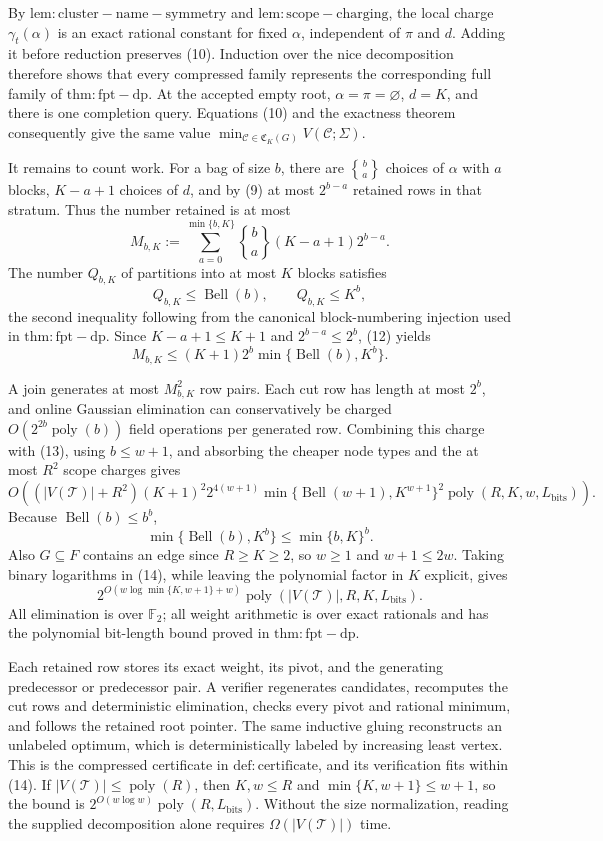 By \(\mathrm{lem:cluster-name-symmetry}\) and \(\mathrm{lem:scope-charging}\), the local charge \(\gamma_t(\alpha)\) is an exact rational constant for fixed \(\alpha\), independent of \(\pi\) and \(d\).  Adding it before reduction preserves (10).  Induction over the nice decomposition therefore shows that every compressed family represents the corresponding full family of \(\mathrm{thm:fpt-dp}\).  At the accepted empty root, \(\alpha=\pi=\varnothing\), \(d=K\), and there is one completion query.  Equations (10) and the exactness theorem consequently give the same value \(\min_{\mathcal C\in\mathfrak C_K(G)}V(\mathcal C;\Sigma)\).

It remains to count work.  For a bag of size \(b\), there are \(\genfrac{\{} {\}}{0pt}{}{b}{a}\) choices of \(\alpha\) with \(a\) blocks, \(K-a+1\) choices of \(d\), and by (9) at most \(2^{b-a}\) retained rows in that stratum.  Thus the number retained is at most
\[
 M_{b,K}:=
 \sum_{a=0}^{\min\{b,K\}}
 \genfrac{\{} {\}}{0pt}{}{b}{a}(K-a+1)2^{b-a}.
\tag{12}
\]
The number \(Q_{b,K}\) of partitions into at most \(K\) blocks satisfies
\[
 Q_{b,K}\le\operatorname{Bell}(b),\qquad Q_{b,K}\le K^b,
\]
the second inequality following from the canonical block-numbering injection used in \(\mathrm{thm:fpt-dp}\).  Since \(K-a+1\le K+1\) and \(2^{b-a}\le2^b\), (12) yields
\[
 M_{b,K}\le (K+1)2^b
 \min\{\operatorname{Bell}(b),K^b\}.
\tag{13}
\]

A join generates at most \(M_{b,K}^2\) row pairs.  Each cut row has length at most \(2^b\), and online Gaussian elimination can conservatively be charged \(O(2^{2b}\operatorname{poly}(b))\) field operations per generated row.  Combining this charge with (13), using \(b\le w+1\), and absorbing the cheaper node types and the at most \(R^2\) scope charges gives
\[
 O\!\left((|V(\mathcal T)|+R^2)(K+1)^2 2^{4(w+1)}
 \min\{\operatorname{Bell}(w+1),K^{w+1}\}^2
 \operatorname{poly}(R,K,w,L_{\mathrm{bits}})\right).
\tag{14}
\]
Because \(\operatorname{Bell}(b)\le b^b\),
\[
 \min\{\operatorname{Bell}(b),K^b\}
 \le \min\{b,K\}^b.
\]
Also \(G\subseteq F\) contains an edge since \(R\ge K\ge2\), so \(w\ge1\) and \(w+1\le2w\).  Taking binary logarithms in (14), while leaving the polynomial factor in \(K\) explicit, gives
\[
 2^{O(w\log\min\{K,w+1\}+w)}
 \operatorname{poly}(|V(\mathcal T)|,R,K,L_{\mathrm{bits}}).
\]
All elimination is over \(\mathbb F_2\); all weight arithmetic is over exact rationals and has the polynomial bit-length bound proved in \(\mathrm{thm:fpt-dp}\).

Each retained row stores its exact weight, its pivot, and the generating predecessor or predecessor pair.  A verifier regenerates candidates, recomputes the cut rows and deterministic elimination, checks every pivot and rational minimum, and follows the retained root pointer.  The same inductive gluing reconstructs an unlabeled optimum, which is deterministically labeled by increasing least vertex.  This is the compressed certificate in \(\mathrm{def:certificate}\), and its verification fits within (14).  If \(|V(\mathcal T)|\le\operatorname{poly}(R)\), then \(K,w\le R\) and \(\min\{K,w+1\}\le w+1\), so the bound is \(2^{O(w\log w)}\operatorname{poly}(R,L_{\mathrm{bits}})\).  Without the size normalization, reading the supplied decomposition alone requires \(\Omega(|V(\mathcal T)|)\) time.
